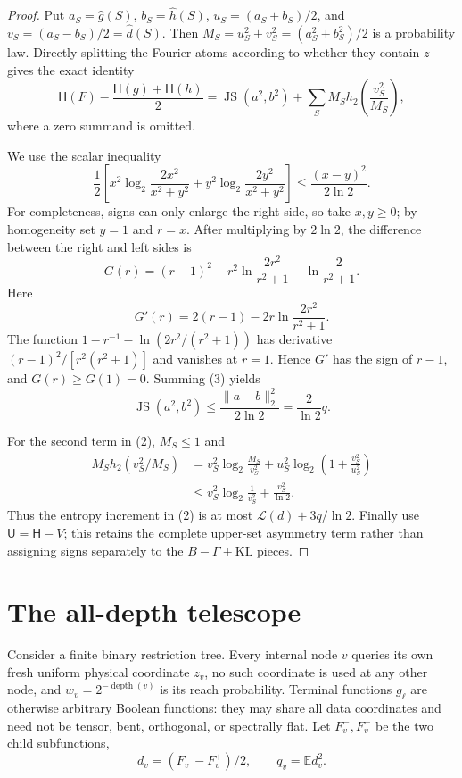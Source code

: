 \documentclass[11pt]{article}
\newcommand{\E}{\mathbb E}
\newcommand{\cH}{\mathsf H}
\newcommand{\cU}{\mathsf U}
\begin{document}
\begin{proof}
Put $a_S=\widehat g(S)$, $b_S=\widehat h(S)$,
$u_S=(a_S+b_S)/2$, and $v_S=(a_S-b_S)/2=\widehat d(S)$.
Then $M_S=u_S^2+v_S^2=(a_S^2+b_S^2)/2$ is a probability law.  Directly
splitting the Fourier atoms according to whether they contain $z$ gives
the exact identity
\[
 \cH(F)-\frac{\cH(g)+\cH(h)}2
  =\operatorname{JS}(a^2,b^2)
   +\sum_S M_S h_2\!\left(\frac{v_S^2}{M_S}\right),       \tag{2}
\]
where a zero summand is omitted.

We use the scalar inequality
\[
 \frac12\left[x^2\log_2\frac{2x^2}{x^2+y^2}
 +y^2\log_2\frac{2y^2}{x^2+y^2}\right]
 \leq\frac{(x-y)^2}{2\ln2}.                              \tag{3}
\]
For completeness, signs can only enlarge the right side, so take $x,y\geq0$;
by homogeneity set $y=1$ and $r=x$.  After multiplying by $2\ln2$, the
difference between the right and left sides is
\[
 G(r)=(r-1)^2-r^2\ln\frac{2r^2}{r^2+1}
                 -\ln\frac2{r^2+1}.
\]
Here
\[
 G'(r)=2(r-1)-2r\ln\frac{2r^2}{r^2+1}.
\]
The function
$1-r^{-1}-\ln(2r^2/(r^2+1))$ has derivative
$(r-1)^2/[r^2(r^2+1)]$ and vanishes at $r=1$.  Hence $G'$ has the sign of
$r-1$, and $G(r)\geq G(1)=0$.  Summing (3) yields
\[
 \operatorname{JS}(a^2,b^2)
 \leq\frac{\lVert a-b\rVert_2^2}{2\ln2}
 =\frac{2}{\ln2}q.                                      \tag{4}
\]

For the second term in (2), $M_S\leq1$ and
\[
 \begin{aligned}
 M_Sh_2(v_S^2/M_S)
 &=v_S^2\log_2\frac{M_S}{v_S^2}
   +u_S^2\log_2\left(1+\frac{v_S^2}{u_S^2}\right)\\
 &\leq v_S^2\log_2\frac1{v_S^2}+\frac{v_S^2}{\ln2}.
 \end{aligned}
\]
Thus the entropy increment in (2) is at most
$\mathcal L(d)+3q/\ln2$.  Finally use $\cU=\cH-V$; this retains the
complete upper-set asymmetry term rather than assigning signs separately
to the $B-\Gamma+\mathrm{KL}$ pieces.
\end{proof}

\section{The all-depth telescope}

Consider a finite binary restriction tree.  Every internal node $v$ queries
its own fresh uniform physical coordinate $z_v$, no such coordinate is used
at any other node, and $w_v=2^{-\operatorname{depth}(v)}$ is its reach
probability.  Terminal functions $g_\ell$ are otherwise arbitrary Boolean
functions: they may share all data coordinates and need not be tensor,
bent, orthogonal, or spectrally flat.  Let $F_v^-,F_v^+$ be the two child
subfunctions,
\[
 d_v=(F_v^--F_v^+)/2,\qquad q_v=\E d_v^2.
\]
\end{document}
